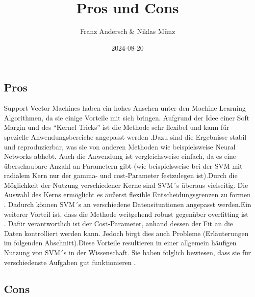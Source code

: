 \documentclass[
]{article}
\title{Pros und Cons}
\author{Franz Andersch \& Niklas Münz}
\date{2024-08-20}
\renewcommand{\maketitle}{}
\begin{document}
\maketitle

\subsection{Pros}

Support Vector Machines haben ein hohes Ansehen unter den Machine
Learning Algorithmen, da sie einige Vorteile mit sich bringen. Aufgrund
der Idee einer Soft Margin und des ``Kernel Tricks'' ist die Methode
sehr flexibel und kann für spezielle Anwendungsbereiche angepasst werden
\parencite{bennettSupportVectorMachines2000}.Dazu sind die Ergebnisse
stabil und reproduzierbar, was sie von anderen Methoden wie
beispielsweise Neural Networks abhebt. Auch die Anwendung ist
vergleichsweise einfach, da es eine überschaubare Anzahl an Parametern
gibt (wie beispielsweise bei der SVM mit radialem Kern nur der gamma-
und cost-Parameter festzulegen ist).\newline Durch die Möglichkeit der
Nutzung verschiedener Kerne sind SVM´s überaus vielseitig. Die Auswahl
des Kerns ermöglicht es äußerst flexible Entscheidungsgrenzen zu formen
\parencite{kuhnAppliedPredictiveModeling2013}. Dadurch können SVM´s an
verschiedene Datensituationen angepasst werden.\newline Ein weiterer
Vorteil ist, dass die Methode weitgehend robust gegenüber overfitting
ist \parencite{kuhnAppliedPredictiveModeling2013}. Dafür verantwortlich
ist der Cost-Parameter, anhand dessen der Fit an die Daten kontrolliert
werden kann. Jedoch birgt dies auch Probleme (Erläuterungen im folgenden
Abschnitt).\newline Diese Vorteile resultieren in einer allgemein
häufigen Nutzung von SVM´s in der Wissenschaft. Sie haben folglich
bewiesen, dass sie für verschiedenste Aufgaben gut funktionieren
\parencite{kuhnAppliedPredictiveModeling2013}.

\subsection{Cons}
\end{document}
